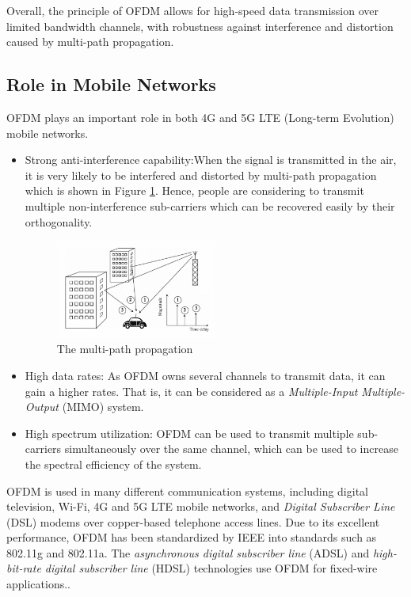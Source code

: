 \documentclass[10pt]{article}
\numberwithin{figure}{section}
\numberwithin{equation}{section}
\begin{document}
Overall, the principle of OFDM allows for high-speed data transmission over limited bandwidth channels, with robustness against interference and distortion caused by multi-path propagation. 
\subsection{Role in Mobile Networks}
OFDM plays an important role in both 4G and 5G LTE (Long-term Evolution) mobile networks.
\begin{itemize}
    \item Strong anti-interference capability:When the signal is transmitted in the air, it is very likely to be interfered and distorted by multi-path propagation which is shown in Figure \ref{fig:multipath propagation}. Hence, people are considering to transmit multiple non-interference sub-carriers which can be recovered easily by their orthogonality.
    \begin{figure}[!ht]
        \centering
        \includegraphics[width=0.5\textwidth]{images/multipath propagation.png}
        \caption{\label{fig:multipath propagation}The multi-path propagation}
    \end{figure}
    \item High data rates: As OFDM owns several channels to transmit data, it can gain a higher rates. That is, it can be considered as a \textit{Multiple-Input Multiple-Output} (MIMO) system.
    \item High spectrum utilization: OFDM can be used to transmit multiple sub-carriers simultaneously over the same channel, which can be used to increase the spectral efficiency of the system.
\end{itemize}

OFDM is used in many different communication systems, including digital television, Wi-Fi, 4G and 5G LTE  mobile networks, and \textit{Digital Subscriber Line} (DSL) modems over copper-based telephone access lines. Due to its excellent performance, OFDM has been standardized by IEEE into standards such as 802.11g and 802.11a. The \textit{asynchronous digital subscriber line} (ADSL) and \textit{high-bit-rate digital subscriber line} (HDSL) technologies use OFDM for fixed-wire applications.\cite{RN78, RN79}.
\end{document}
